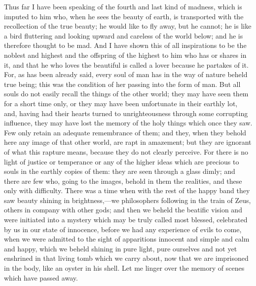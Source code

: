 \documentclass[11pt,letter]{article}
\begin{document}
\par  Thus far I have been speaking of the fourth and last kind of madness, which is imputed to him who, when he sees the beauty of earth, is transported with the recollection of the true beauty; he would like to fly away, but he cannot; he is like a bird fluttering and looking upward and careless of the world below; and he is therefore thought to be mad. And I have shown this of all inspirations to be the noblest and highest and the offspring of the highest to him who has or shares in it, and that he who loves the beautiful is called a lover because he partakes of it. For, as has been already said, every soul of man has in the way of nature beheld true being; this was the condition of her passing into the form of man. But all souls do not easily recall the things of the other world; they may have seen them for a short time only, or they may have been unfortunate in their earthly lot, and, having had their hearts turned to unrighteousness through some corrupting influence, they may have lost the memory of the holy things which once they saw. Few only retain an adequate remembrance of them; and they, when they behold here any image of that other world, are rapt in amazement; but they are ignorant of what this rapture means, because they do not clearly perceive. For there is no light of justice or temperance or any of the higher ideas which are precious to souls in the earthly copies of them: they are seen through a glass dimly; and there are few who, going to the images, behold in them the realities, and these only with difficulty. There was a time when with the rest of the happy band they saw beauty shining in brightness,—we philosophers following in the train of Zeus, others in company with other gods; and then we beheld the beatific vision and were initiated into a mystery which may be truly called most blessed, celebrated by us in our state of innocence, before we had any experience of evils to come, when we were admitted to the sight of apparitions innocent and simple and calm and happy, which we beheld shining in pure light, pure ourselves and not yet enshrined in that living tomb which we carry about, now that we are imprisoned in the body, like an oyster in his shell. Let me linger over the memory of scenes which have passed away.
\end{document}
